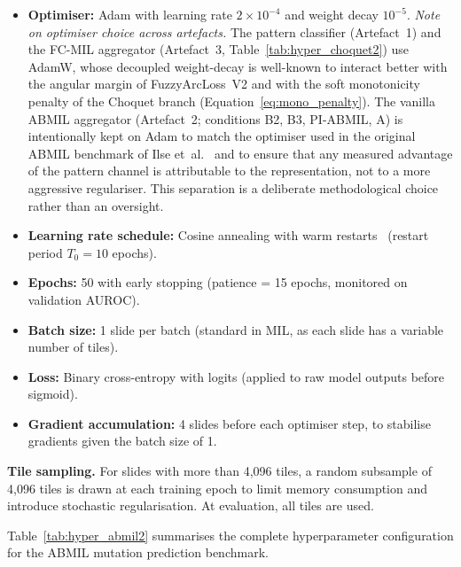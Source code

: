 \begin{itemize}
    \item \textbf{Optimiser:} Adam with learning rate
    $2 \times 10^{-4}$ and weight decay $10^{-5}$.
    \emph{Note on optimiser choice across artefacts.}
    The pattern classifier (Artefact~1) and the FC-MIL aggregator
    (Artefact~3, Table~\ref{tab:hyper_choquet2}) use AdamW, whose
    decoupled weight-decay is well-known to interact better with the
    angular margin of FuzzyArcLoss~V2 and with the soft monotonicity
    penalty of the Choquet branch (Equation~\ref{eq:mono_penalty}).
    The vanilla ABMIL aggregator (Artefact~2; conditions B2, B3,
    PI-ABMIL, A) is intentionally kept on Adam to match the optimiser
    used in the original ABMIL benchmark of
    Ilse et~al.~\cite{ilse2018attention} and to ensure that any
    measured advantage of the pattern channel is attributable to the
    representation, not to a more aggressive regulariser.
    This separation is a deliberate methodological choice rather than
    an oversight.
    \item \textbf{Learning rate schedule:} Cosine annealing with warm restarts~\cite{loshchilov2017sgdr} (restart period $T_0 = 10$ epochs).
    \item \textbf{Epochs:} 50 with early stopping (patience = 15 epochs, monitored on validation AUROC).
    \item \textbf{Batch size:} 1 slide per batch (standard in MIL, as each slide has a variable number of tiles).
    \item \textbf{Loss:} Binary cross-entropy with logits (applied to raw model outputs before sigmoid).
    \item \textbf{Gradient accumulation:} 4 slides before each optimiser step, to stabilise gradients given the batch size of 1.
\end{itemize}

\textbf{Tile sampling.}
For slides with more than 4{,}096 tiles, a random subsample of 4{,}096 tiles is drawn at each training epoch to limit memory consumption and introduce stochastic regularisation.
At evaluation, all tiles are used.

Table~\ref{tab:hyper_abmil2} summarises the complete hyperparameter
configuration for the ABMIL mutation prediction benchmark.
 
